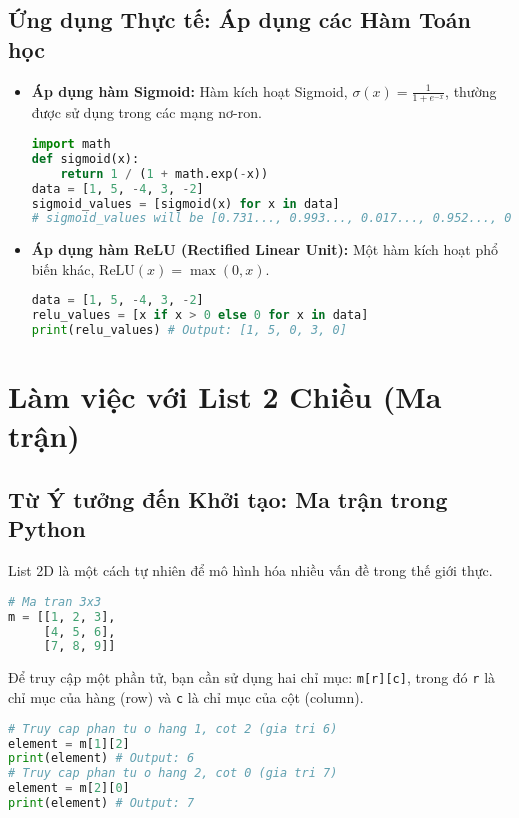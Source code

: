 \documentclass[11pt]{article}
\begin{document}
\subsection{Ứng dụng Thực tế: Áp dụng các Hàm Toán học}
\begin{itemize}
    \item \textbf{Áp dụng hàm Sigmoid:} Hàm kích hoạt Sigmoid, $ \sigma(x)=\frac{1}{1+e^{-x}} $, thường được sử dụng trong các mạng nơ-ron.
    \begin{lstlisting}[language=Python]
import math
def sigmoid(x):
    return 1 / (1 + math.exp(-x))
data = [1, 5, -4, 3, -2]
sigmoid_values = [sigmoid(x) for x in data]
# sigmoid_values will be [0.731..., 0.993..., 0.017..., 0.952..., 0.119...]
    \end{lstlisting}
    \item \textbf{Áp dụng hàm ReLU (Rectified Linear Unit):} Một hàm kích hoạt phổ biến khác, $ \text{ReLU}(x) = \max(0, x) $.
    \begin{lstlisting}[language=Python]
data = [1, 5, -4, 3, -2]
relu_values = [x if x > 0 else 0 for x in data]
print(relu_values) # Output: [1, 5, 0, 3, 0]
    \end{lstlisting}
\end{itemize}

\section{Làm việc với List 2 Chiều (Ma trận)}
\subsection{Từ Ý tưởng đến Khởi tạo: Ma trận trong Python}
List 2D là một cách tự nhiên để mô hình hóa nhiều vấn đề trong thế giới thực.
\begin{lstlisting}[language=Python]
# Ma tran 3x3
m = [[1, 2, 3],
     [4, 5, 6],
     [7, 8, 9]]
\end{lstlisting}
Để truy cập một phần tử, bạn cần sử dụng hai chỉ mục: \texttt{m[r][c]}, trong đó \texttt{r} là chỉ mục của hàng (row) và \texttt{c} là chỉ mục của cột (column).
\begin{lstlisting}[language=Python]
# Truy cap phan tu o hang 1, cot 2 (gia tri 6)
element = m[1][2]
print(element) # Output: 6
# Truy cap phan tu o hang 2, cot 0 (gia tri 7)
element = m[2][0]
print(element) # Output: 7
\end{lstlisting}
\end{document}

